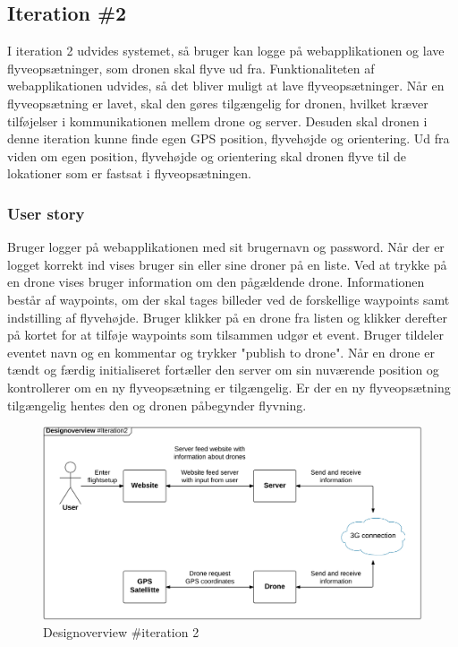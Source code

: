 \subsection{Iteration \#2}
I iteration 2 udvides systemet, så bruger kan logge på webapplikationen og lave flyveopsætninger, som dronen skal flyve ud fra. Funktionaliteten af webapplikationen udvides, så det bliver muligt at lave flyveopsætninger. Når en flyveopsætning er lavet, skal den gøres tilgængelig for dronen, hvilket kræver tilføjelser i kommunikationen mellem drone og server. 
Desuden skal dronen i denne iteration kunne finde egen GPS position, flyvehøjde og orientering. Ud fra viden om egen position, flyvehøjde og orientering skal dronen flyve til de lokationer som er fastsat i flyveopsætningen. 


\subsubsection*{User story}
Bruger logger på webapplikationen med sit brugernavn og password. Når der er logget korrekt ind vises bruger sin eller sine droner på en liste. Ved at trykke på en drone vises bruger information om den pågældende drone. Informationen består af waypoints, om der skal tages billeder ved de forskellige waypoints samt indstilling af flyvehøjde. Bruger klikker på en drone fra listen og klikker derefter på kortet for at tilføje waypoints som tilsammen udgør et event. Bruger tildeler eventet navn og en kommentar og trykker "publish to drone".
Når en drone er tændt og færdig initialiseret fortæller den server om sin nuværende position og kontrollerer om en ny flyveopsætning er tilgængelig. Er der en ny flyveopsætning tilgængelig hentes den og dronen påbegynder flyvning.

\begin{figure}[H]
	\centering
	\includegraphics[width=1\textwidth]{Billeder/design_overview/design_overview_iteration2.png}
	\vspace{-.5cm}
	\caption{Designoverview \#iteration 2}
	\label{fig:design_overview_UC1}
\end{figure}


